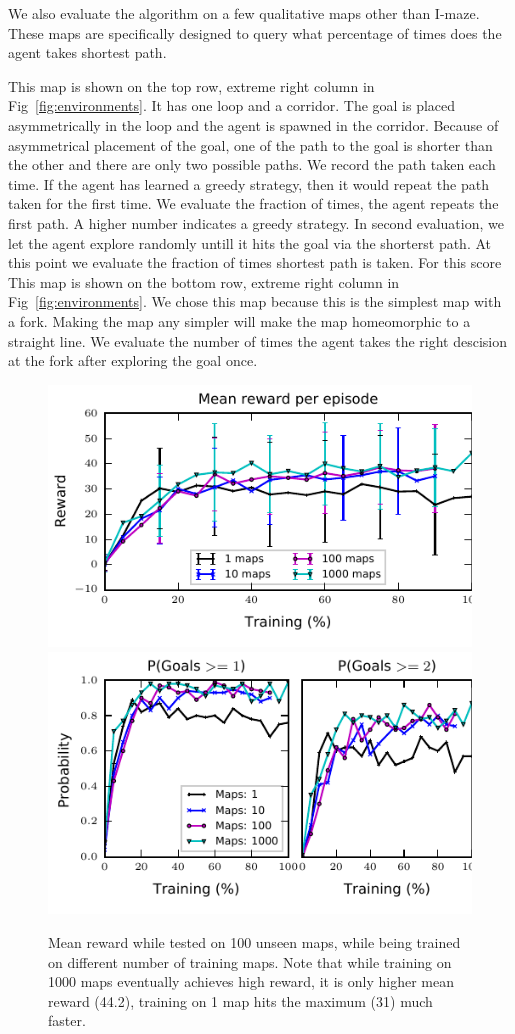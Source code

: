 We also evaluate the algorithm on a few qualitative maps other than I-maze. These maps are specifically designed to query what percentage of times does the agent takes shortest path.

\setcounter{Benchmark}{0}
\begin{description}
    This map is shown on the top row, extreme right column in Fig~\ref{fig:environments}. It has one loop and a corridor.
    The goal is placed asymmetrically in the loop and the agent is spawned in the corridor.
    Because of asymmetrical placement of the goal, one of the path to the goal is shorter than the other and there are only two possible paths.
    We record the path taken each time. If the agent has learned a greedy strategy, then it would repeat the path taken for the first time.
    We evaluate the fraction of times, the agent repeats the first path. A higher number indicates a greedy strategy.
    In second evaluation, we let the agent explore randomly untill it hits the goal via the shorterst path.
    At this point we evaluate the  fraction of times shortest path is taken. For this score 
    This map is shown on the bottom row, extreme right column in Fig~\ref{fig:environments}.
    We chose this map because this is the simplest map with a fork. Making the map any simpler will make the map homeomorphic to a straight line. 
    We evaluate the number of times the agent takes the right descision at the fork after exploring the goal once.
\end{description}

\begin{figure}%
\includegraphics[width=0.5\columnwidth]{images/plot_reward_3D-1000.pdf}%
\includegraphics[width=0.5\columnwidth]{images/plot_probability_3D-1000.pdf}%
\vspace{-1em}%
\caption{Mean reward while tested on 100 unseen maps, while being trained on different number of training maps. Note that while training on 1000 maps eventually achieves high reward, it is only higher mean reward (44.2), training on 1 map hits the maximum (31) much faster.}%
\label{fig:plot_reward_on_testing}%
\end{figure}
